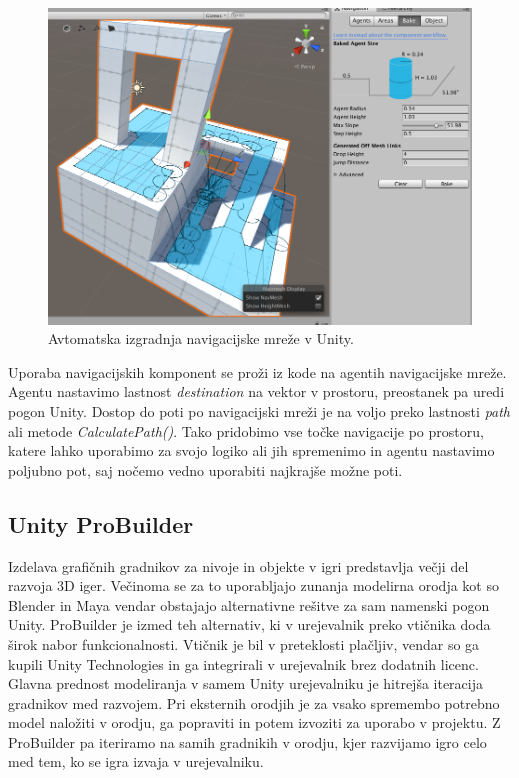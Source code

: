 \documentclass[12pt,a4paper,twoside]{book}
\begin{document}
\begin{figure}[h]
	\centering
	\includegraphics[width=15cm]{navmesh}
	\caption{Avtomatska izgradnja navigacijske mreže v Unity.}
	\label{slika:navmesh}
\end{figure}

Uporaba navigacijskih komponent se proži iz kode na agentih navigacijske mreže. Agentu nastavimo lastnost \textit{destination} na vektor v prostoru, preostanek pa uredi pogon Unity. Dostop do poti po navigacijski mreži je na voljo preko lastnosti \textit{path} ali metode \textit{CalculatePath()}. Tako pridobimo vse točke navigacije po prostoru, katere lahko uporabimo za svojo logiko ali jih spremenimo in agentu nastavimo poljubno pot, saj nočemo vedno uporabiti najkrajše možne poti. 

\subsection{Unity ProBuilder}
Izdelava grafičnih gradnikov za nivoje in objekte v igri predstavlja večji del razvoja 3D iger. Večinoma se za to uporabljajo zunanja modelirna orodja kot so Blender in Maya vendar obstajajo alternativne rešitve za sam namenski pogon Unity. ProBuilder je izmed teh alternativ, ki v urejevalnik preko vtičnika doda širok nabor funkcionalnosti. Vtičnik je bil v preteklosti plačljiv, vendar so ga kupili Unity Technologies in ga integrirali v urejevalnik brez dodatnih licenc. Glavna prednost modeliranja v samem Unity urejevalniku je hitrejša iteracija gradnikov med razvojem. Pri eksternih orodjih je za vsako spremembo potrebno model naložiti v orodju, ga popraviti in potem izvoziti za uporabo v projektu. Z ProBuilder pa iteriramo na samih gradnikih v orodju, kjer razvijamo igro celo med tem, ko se igra izvaja v urejevalniku.
\end{document}
